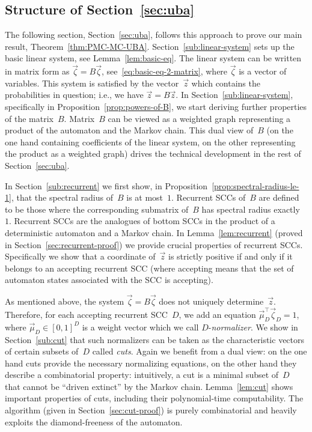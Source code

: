 \documentclass{elsarticle}
\begin{document}
\subsection{Structure of Section~\ref{sec:uba}}
The following section, Section~\ref{sec:uba}, follows this approach to prove our main result, Theorem~\ref{thm:PMC-MC-UBA}.
Section~\ref{sub:linear-system} sets up the basic linear system, see Lemma~\ref{lem:basic-eq}.
The linear system can be written in matrix form as $\vec{\zeta} = B \vec{\zeta}$, see~\eqref{eq:basic-eq-2-matrix}, where $\vec{\zeta}$ is a vector of variables.
This system is satisfied by the vector~$\vec{z}$ which contains the probabilities in question; i.e., we have $\vec{z} = B \vec{z}$.
In Section~\ref{sub:linear-system}, specifically in Proposition~\ref{prop:powers-of-B}, we start deriving further properties of the matrix~$B$.
Matrix~$B$ can be viewed as a weighted graph representing a product of the automaton and the Markov chain.
This dual view of~$B$ (on the one hand containing coefficients of the linear system, on the other representing the product as a weighted graph) drives the technical development in the rest of Section~\ref{sec:uba}.

In Section~\ref{sub:recurrent} we first show, in Proposition~\ref{prop:spectral-radius-le-1}, that the spectral radius of~$B$ is at most~$1$.
Recurrent SCCs of~$B$ are defined to be those where the corresponding submatrix of~$B$ has spectral radius exactly~$1$.
Recurrent SCCs are the analogues of bottom SCCs in the product of a deterministic automaton and a Markov chain.
In Lemma~\ref{lem:recurrent} (proved in Section~\ref{sec:recurrent-proof}) we provide crucial properties of recurrent SCCs.
Specifically we show that a coordinate of~$\vec{z}$ is strictly positive if and only if it belongs to an accepting recurrent SCC (where accepting means that the set of automaton states associated with the SCC is accepting).

As mentioned above, the system $\vec{\zeta} = B \vec{\zeta}$ does not uniquely determine~$\vec{z}$.
Therefore, for each accepting recurrent SCC~$D$, we add an equation $\vec{\mu}_D^\top \vec{\zeta}_D = 1$, where $\vec{\mu}_D \in [0,1]^D$ is a weight vector which we call $D$-\emph{normalizer}.
We show in Section~\ref{sub:cut} that such normalizers can be taken as the characteristic vectors of certain subsets of~$D$ called \emph{cuts}.
Again we benefit from a dual view: on the one hand cuts provide the necessary normalizing equations, on the other hand they describe a combinatorial property: intuitively, a cut is a minimal subset of~$D$ that cannot be ``driven extinct'' by the Markov chain.
Lemma~\ref{lem:cut} shows important properties of cuts, including their polynomial-time computability.
The algorithm (given in Section~\ref{sec:cut-proof}) is purely combinatorial and heavily exploits the diamond-freeness of the automaton.
\end{document}
